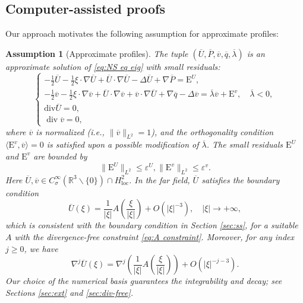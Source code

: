 \documentclass[11pt,a4paper]{article}
\numberwithin{equation}{section}
\newcommand{\Epsilon}{\mathrm{E}}
\newcommand{\cdummy}{\cdot}
\newcommand{\tmop}[1]{\ensuremath{\operatorname{#1}}}
\newtheorem{assumption}{Assumption}
\begin{document}
\subsection{Computer-assisted proofs}\label{subsec:cap}
Our approach
motivates the following assumption for approximate profiles:

\begin{assumption}[Approximate profiles]
  \label{asm:num} The tuple $(\overline{U}, \overline{P}, \overline{v},
  \overline{q}, \overline{\lambda})$ is an approximate solution of \eqref{eq:NS
  eq eig} with small residuals:
\begin{equation*}
    \left\{\begin{array}{l}
      - \frac{1}{2}  \overline{U} - \frac{1}{2} \xi \cdummy \nabla \overline{U}
      + \overline{U} \cdot \nabla \overline{U} - \Delta \overline{U} + \nabla
      \overline{P} = \Epsilon^U,\\
      - \frac{1}{2}  \overline{v} - \frac{1}{2} \xi \cdummy \nabla \overline{v}
      + \overline{U} \cdot \nabla \overline{v} + \overline{v} \cdot \nabla
      \overline{U} + \nabla \overline{q} - \Delta \overline{v} =
      \overline{\lambda}  \overline{v} + \Epsilon^v, \quad \overline{\lambda}
      < 0,\\
      \mathrm{div}  \overline{U} = 0,\\
      \tmop{div} \overline{v} = 0,
    \end{array}\right. \label{eq:NS rescale numerical}
  \end{equation*}
  where $\overline{v}$ is normalized (i.e., $\| \overline{v} \|_{L^2} = 1$), and the
  orthogonality condition $\langle \Epsilon^v, \overline{v} \rangle = 0$ is
  satisfied upon a possible modification of $\overline{\lambda}$. The small residuals $\Epsilon^U$ and $\Epsilon^v$ are bounded by
  \[ \| \Epsilon^U \|_{L^2} \leqslant \varepsilon^U, \| \Epsilon^v \|_{L^2} \leqslant
     \varepsilon^v. \]
  Here $\overline{U},\overline{v}\in
  C^{\infty}_\sigma (\mathbb{R}^3 \backslash \{ 0 \})\cap H^2_{\tmop{loc}}$. In the far field, $\overline{U}$ satisfies the boundary condition \begin{equation}
    \label{boundary u}\overline{U} (\xi)=\frac{1}{| \xi |} A ( \frac{\xi}{| \xi |} ) +
   O( {| \xi |^{-3}} ), \quad| \xi | \to + \infty,
\end{equation} which is consistent with the boundary condition in Section \ref{sec:ss}, for a suitable $A$ with the divergence-free constraint \eqref{eq:A constraint}. Moreover, for any index $j\geqslant 0$, we have \begin{equation}
    \label{higher boundary u}
\nabla^j\overline{U}(\xi)=\nabla^j(\frac{1}{| \xi |} A ( \frac{\xi}{| \xi |} ))+O(|\xi|^{-j-3}).\end{equation} Our choice of the numerical basis guarantees the integrability and decay; see Sections \ref{sec:ext} and \ref{sec:div-free}.
\end{assumption}
\end{document}
